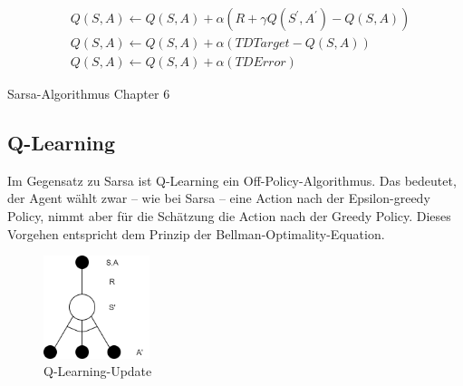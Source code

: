 \begin{align}
&Q\left(S,A\right)\gets Q\left(S,A\right)+\alpha\left(R+\gamma Q\left(S^\prime,A^\prime\right)-Q\left(S,A\right)\right) \nonumber\\
&Q\left(S,A\right)\gets Q\left(S,A\right)+\alpha\left(TDTarget-Q\left(S,A\right)\right) \nonumber\\
&Q\left(S,A\right)\gets Q\left(S,A\right)+\alpha\left(TDError\right) \label{sarsa_eq}
\end{align}




\begin{algorithm}
\begin{algorithmic}[1]
\end{algorithmic}
\caption{Sarsa-Algorithmus \cite{sutton_reinforcement_2018} Chapter 6}
\end{algorithm}




\subsection{Q-Learning}
Im Gegensatz zu Sarsa ist Q-Learning \cite{dayan1992q, watkins1989learning} ein Off-Policy-Algorithmus. Das bedeutet, der Agent wählt zwar – wie bei Sarsa – eine Action nach der Epsilon-greedy Policy, nimmt aber für die Schätzung die Action nach der Greedy Policy. Dieses Vorgehen entspricht dem Prinzip der Bellman-Optimality-Equation.

 \begin{figure}[ht]
  \centering
  \includegraphics[height=3cm]{img/Q-Learning.png}
  \caption{Q-Learning-Update}
      \label{fig:q-update}
\end{figure} 








